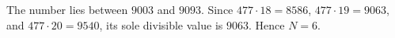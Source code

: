 The number lies between $9003$ and $9093$. Since $477\cdot18=8586$, $477\cdot19=9063$, and $477\cdot20=9540$, its sole divisible value is $9063$. Hence $\boxed{N=6}$.
